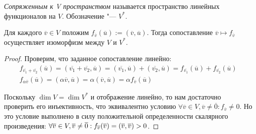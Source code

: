 \begin{definition}
	\textit{Сопряженным к V пространством} называется пространство линейных функционалов на $V$. Обозначение "--- $V^*$.
\end{definition}

\begin{theorem}
	Для каждого $\overline{v} \in V$ положим $f_{\overline{v}}(\overline{u}) := (\overline{v}, \overline{u})$. Тогда сопоставление $\overline{v} \mapsto f_{\overline{v}}$ осуществляет изоморфизм между $V$ и $V^*$.
\end{theorem}

\begin{proof}
	Проверим, что заданное сопоставление линейно:
	\begin{gather*}
		f_{\overline{v_1} + \overline{v_2}}(\overline{u}) = (\overline{v_1} + \overline{v_2}, \overline{u}) = (\overline{v_1}, \overline{u}) + (\overline{v_2}, \overline{u}) = f_{\overline{v_1}}(\overline{u}) + f_{\overline{v_2}}(\overline{u})\\
		f_{\alpha\overline{v}}(\overline{u}) = (\alpha\overline{v}, \overline{u}) = \alpha(\overline{v}, \overline{u}) = \alpha f_{\overline{v}}(\overline{u})
	\end{gather*}
	
	Поскольку $\dim{V} = \dim{V^*}$ и отображение линейно, то нам достаточно проверить его инъективность, что эквивалентно условию $\forall \overline{v} \in V, \overline{v} \ne \overline{0}: f_{\overline{v}} \ne 0$. Но это условие выполнено в силу положительной определенности скалярного произведения: $\forall \overline{v} \in V, \overline{v} \ne \overline{0}: f_{\overline{v}}(\overline{v}) \hm= (\overline{v}, \overline{v}) > 0$.
\end{proof}